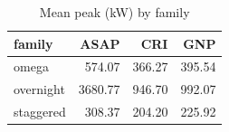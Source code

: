 \begin{table}[htbp]
\centering
\small
\caption{Mean peak (kW) by family}
\label{tab:E9_managerial_peaks_by_family}
\begin{tabular}{lrrr}
\toprule
family & ASAP & CRI & GNP \\
\midrule
omega & 574.07 & 366.27 & 395.54 \\
overnight & 3680.77 & 946.70 & 992.07 \\
staggered & 308.37 & 204.20 & 225.92 \\
\bottomrule
\end{tabular}
\end{table}

